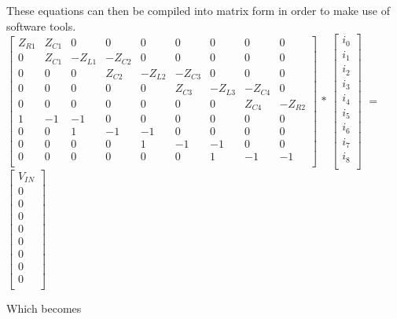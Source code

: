 \documentclass[11pt,a4paper]{article}
\begin{document}
These equations can then be compiled into matrix form in order to make use of software tools.\\

$\begin{bmatrix*}
	Z_{R1} & Z_{C1} & 0 & 0 & 0 & 0 & 0 & 0 & 0 \\
	0 & Z_{C1} & -Z_{L1} & -Z_{C2} & 0 & 0 & 0 & 0 & 0\\
	0 & 0 &  0 & Z_{C2} & -Z_{L2} & -Z_{C3} & 0 & 0 & 0\\
	0 & 0 & 0 & 0 & 0 & Z_{C3} & -Z_{L3} & -Z_{C4} & 0\\
	0 & 0 & 0 & 0 & 0 & 0 & 0 & Z_{C4} & -Z_{R2}\\
	1 & -1 & -1 & 0 & 0 & 0 & 0 & 0 & 0\\
	0 & 0 & 1 & -1 & -1 & 0 & 0 & 0 & 0\\
	0 & 0 & 0 & 0 & 1 & -1 & -1 & 0 & 0\\
	0 & 0 & 0 & 0 & 0 & 0 & 1 & -1 & -1\\
\end{bmatrix*}$
$ * $
$\begin{bmatrix}
	i_{0}\\
	i_{1}\\
	i_{2}\\
	i_{3}\\
	i_{4}\\
	i_{5}\\
	i_{6}\\
	i_{7}\\
	i_{8}\\
\end{bmatrix}$
$ = $
$\begin{bmatrix}
	V_{IN}\\
	0\\
	0\\
	0\\
	0\\
	0\\
	0\\
	0\\
	0\\
\end{bmatrix}$ \bigskip

Which becomes \\
\end{document}
